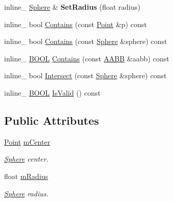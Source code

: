 \begin{DoxyCompactItemize}
\item 
inline\+\_\+ \hyperlink{classSphere}{Sphere} \& {\bfseries Set\+Radius} (float radius)\hypertarget{classSphere_a691141b1317ecdc3887fefb0565d3176}{}\label{classSphere_a691141b1317ecdc3887fefb0565d3176}

\item 
inline\+\_\+ bool \hyperlink{classSphere_a9cfe5aa55b1e19c9ba53d6860dfdc4a3}{Contains} (const \hyperlink{classPoint}{Point} \&p) const 
\item 
inline\+\_\+ bool \hyperlink{classSphere_a319eae210b91c81697ba56ca5a018f45}{Contains} (const \hyperlink{classSphere}{Sphere} \&sphere) const 
\item 
inline\+\_\+ \hyperlink{IceTypes_8h_a050c65e107f0c828f856a231f4b4e788}{B\+O\+OL} \hyperlink{classSphere_a087d627821bc82578ec5aca1157c700f}{Contains} (const \hyperlink{classAABB}{A\+A\+BB} \&aabb) const 
\item 
inline\+\_\+ bool \hyperlink{classSphere_afb707ef9493e1cc9eee4eba1ff47414e}{Intersect} (const \hyperlink{classSphere}{Sphere} \&sphere) const 
\item 
inline\+\_\+ \hyperlink{IceTypes_8h_a050c65e107f0c828f856a231f4b4e788}{B\+O\+OL} \hyperlink{classSphere_aba1e41199598c0335658031ff1d4bca0}{Is\+Valid} () const 
\end{DoxyCompactItemize}
\subsection*{Public Attributes}
\begin{DoxyCompactItemize}
\item 
\hyperlink{classPoint}{Point} \hyperlink{classSphere_ab1945f46dce4427c96c466adb3130a90}{m\+Center}\hypertarget{classSphere_ab1945f46dce4427c96c466adb3130a90}{}\label{classSphere_ab1945f46dce4427c96c466adb3130a90}

\begin{DoxyCompactList}\small\item\em \hyperlink{classSphere}{Sphere} center. \end{DoxyCompactList}\item 
float \hyperlink{classSphere_a1d2aa35ce4cfd30808027f10ec282e2f}{m\+Radius}\hypertarget{classSphere_a1d2aa35ce4cfd30808027f10ec282e2f}{}\label{classSphere_a1d2aa35ce4cfd30808027f10ec282e2f}

\begin{DoxyCompactList}\small\item\em \hyperlink{classSphere}{Sphere} radius. \end{DoxyCompactList}\end{DoxyCompactItemize}


